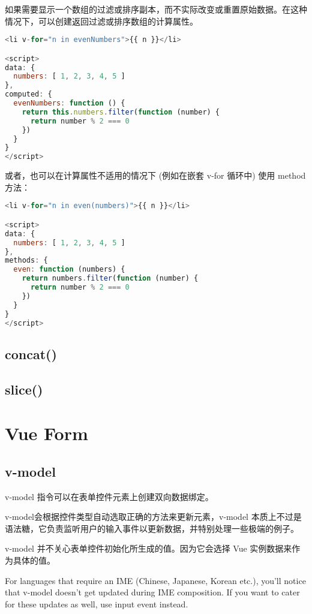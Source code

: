 如果需要显示一个数组的过滤或排序副本，而不实际改变或重置原始数据。在这种情况下，可以创建返回过滤或排序数组的计算属性。

\begin{lstlisting}[language=JavaScript]
<li v-for="n in evenNumbers">{{ n }}</li>

<script>
data: {
  numbers: [ 1, 2, 3, 4, 5 ]
},
computed: {
  evenNumbers: function () {
    return this.numbers.filter(function (number) {
      return number % 2 === 0
    })
  }
}
</script>
\end{lstlisting}

或者，也可以在计算属性不适用的情况下 (例如在嵌套 v-for 循环中) 使用 method 方法：

\begin{lstlisting}[language=JavaScript]
<li v-for="n in even(numbers)">{{ n }}</li>

<script>
data: {
  numbers: [ 1, 2, 3, 4, 5 ]
},
methods: {
  even: function (numbers) {
    return numbers.filter(function (number) {
      return number % 2 === 0
    })
  }
}
</script>
\end{lstlisting}



\section{concat()}

\section{slice()}



\chapter{Vue Form}




\section{v-model}


v-model 指令可以在表单控件元素上创建双向数据绑定。

v-model会根据控件类型自动选取正确的方法来更新元素，v-model 本质上不过是语法糖，它负责监听用户的输入事件以更新数据，并特别处理一些极端的例子。


v-model 并不关心表单控件初始化所生成的值。因为它会选择 Vue 实例数据来作为具体的值。

For languages that require an IME (Chinese, Japanese, Korean etc.), you’ll notice that v-model doesn’t get updated during IME composition. If you want to cater for these updates as well, use input event instead.

